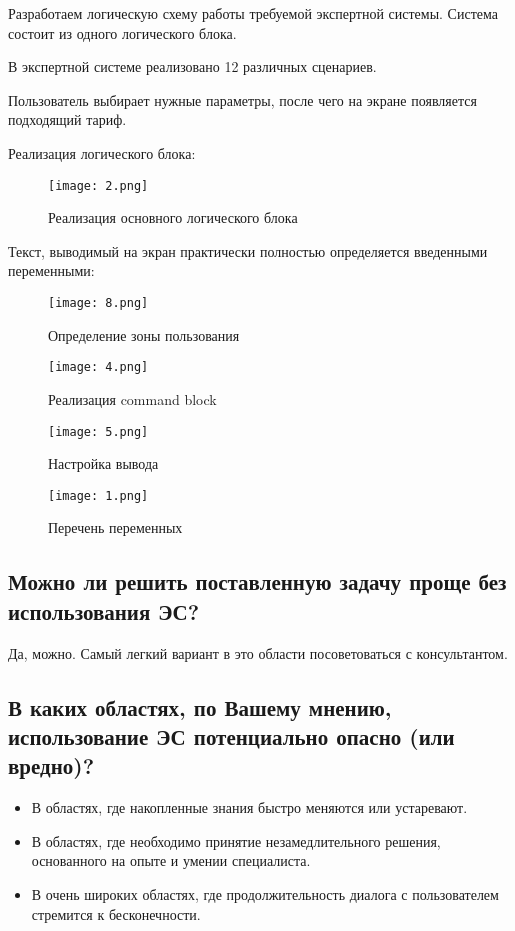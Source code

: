 \documentclass[14pt,a4paper,report]{report}
\begin{document}
Разработаем логическую схему работы требуемой экспертной системы. Система состоит из одного логического блока.

В экспертной системе реализовано 12 различных сценариев.

Пользователь выбирает нужные параметры, после чего на экране появляется подходящий тариф.

Реализация логического блока:

\begin{figure}[h!]
	\centering
	\texttt{[image: 2.png]}
	\caption{Реализация основного логического блока}
\end{figure}


Текст, выводимый на экран практически полностью определяется введенными переменными:

\begin{figure}[h!]
	\centering
	\texttt{[image: 8.png]}
	\caption{Определение зоны пользования}
\end{figure}


\begin{figure*}[h!]
	\texttt{[image: 4.png]}\hfill
	\caption{Реализация command block}
\end{figure*}


\begin{figure}[h!]
	\centering
	\texttt{[image: 5.png]}
	\caption{Настройка вывода}
\end{figure}


\begin{figure}[h!]
	\centering
	\texttt{[image: 1.png]}
	\caption{Перечень переменных}
\end{figure}

\clearpage
\subsection{Можно ли решить поставленную задачу проще без использования ЭС?}

Да, можно. Самый легкий вариант в это области посоветоваться с консультантом. 

\subsection{В каких областях, по Вашему мнению, использование ЭС потенциально опасно (или вредно)?}

\begin{itemize}
	\item В областях, где накопленные знания быстро меняются или устаревают.
	\item В областях, где необходимо принятие незамедлительного решения, основанного на опыте и умении специалиста.
	\item В очень широких областях, где продолжительность диалога с пользователем стремится к бесконечности.
\end{itemize}
\end{document}
